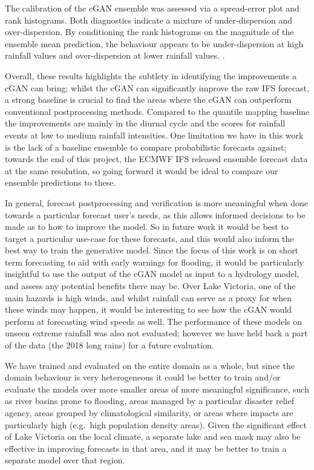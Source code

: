 \documentclass{article}
\begin{document}
The calibration of the cGAN ensemble was assessed via a spread-error plot and rank histograms. Both diagnostics indicate a mixture of under-dispersion and over-dispersion. By conditioning the rank histograms on the magnitude of the ensemble mean prediction, the behaviour appears to be under-dispersion at high rainfall values and over-dispersion at lower rainfall values. .

Overall, these results highlights the subtlety in identifying the improvements a cGAN can bring; whilst the cGAN can significantly improve the raw IFS forecast, a strong baseline is crucial to find the areas where the cGAN can outperform conventional postprocessing methods. Compared to the quantile mapping baseline the improvements are mainly in the diurnal cycle and the scores for rainfall events at low to medium rainfall intensities. One limitation we have in this work is the lack of a baseline ensemble to compare probabilistic forecasts against; towards the end of this project, the ECMWF IFS released ensemble forecast data at the same resolution, so going forward it would be ideal to compare our ensemble predictions to these. 
 
In general, forecast postprocessing and verification is more meaningful when done towards a particular forecast user's needs, as this allows informed decisions to be made as to how to improve the model. So in future work it would be best to target a particular use-case for these forecasts, and this would also inform the best way to train the generative model. Since the focus of this work is on short term forecasting to aid with early warnings for flooding, it would be particularly insightful to use the output of the cGAN model as input to a hydrology model, and assess any potential benefits there may be. Over Lake Victoria, one of the main hazards is high winds, and whilst rainfall can serve as a proxy for when these winds may happen, it would be interesting to see how the cGAN would perform at forecasting wind speeds as well. The performance of these models on unseen extreme rainfall was also not evaluated; however we have held back a part of the data (the 2018 long rains) for a future evaluation.

We have trained and evaluated on the entire domain as a whole, but since the domain behaviour is very heterogeneous it could be better to train and/or evaluate the models over more smaller areas of more meaningful significance, such as river basins prone to flooding, areas managed by a particular disaster relief agency, areas grouped by climatological similarity, or areas where impacts are particularly high (e.g.~high population density areas). Given the significant effect of Lake Victoria on the local climate, a separate lake and sea mask may also be effective in improving forecasts in that area, and it may be better to train a separate model over that region.
\end{document}
